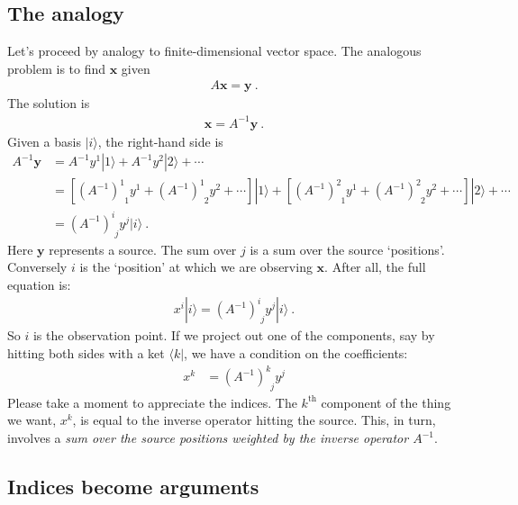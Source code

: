 \documentclass[12pt]{article}
\numberwithin{equation}{section}    %
\renewcommand{\vec}[1]{\mathbf{#1}} %
\begin{document}
\subsection{The analogy}

Let’s proceed by analogy to finite-dimensional vector space. The analogous problem is to find $\vec{x}$ given
\begin{align}
   A \vec{x} = \vec{y} \ .
\end{align}
The solution is 
\begin{align}
  \vec{x} = A^{-1} \vec{y} \ .
\end{align}
Given a basis $|i\rangle$, the right-hand side is
\begin{align}
  A^{-1} \vec{y} &=
  A^{-1} y^1 |1 \rangle +
  A^{-1} y^2 |2 \rangle +
  \cdots
  \\
  &= 
  \left[ (A^{-1})^1_{\phantom 1 1}y^1 + (A^{-1})^1_{\phantom 1 2}y^2 + \cdots \right] |1 \rangle +
  \left[ (A^{-1})^2_{\phantom 1 1}y^1 + (A^{-1})^2_{\phantom 1 2}y^2 + \cdots \right] |2 \rangle + \cdots 
  \\
  &= 
   \left(A^{-1}\right)^i_{\phantom i j}y^j | i \rangle \ .
\end{align}
Here $\vec{y}$ represents a source. The sum over $j$ is a sum over the source `positions'. Conversely $i$ is the `position’ at which we are observing $\vec{x}$. After all, the full equation is:
\begin{align}
  x^i| i\rangle = \left(A^{-1}\right)^i_{\phantom i j}y^j | i \rangle \ . 
\end{align}
So $i$ is the observation point. If we project out one of the components, say by hitting both sides with a ket $\langle k|$, we have a condition on the coefficients:
\begin{align}
  x^k &= \left( A^{-1} \right)^k_{\phantom{k} j}y^j
  \label{eq:x:comp:Ainv:f}
\end{align}
Please take a moment to appreciate the indices. The $k^\text{th}$ component of the thing we want, $x^k$, is equal to the inverse operator hitting the source. This, in turn, involves a \emph{sum over the source positions weighted by the inverse operator $A^{-1}$}. 

\subsection{Indices become arguments}
\end{document}
